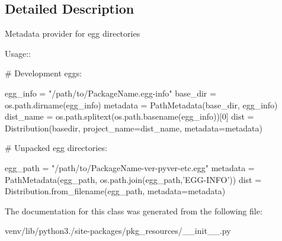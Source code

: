 \subsection{Detailed Description}
\begin{DoxyVerb}Metadata provider for egg directories

Usage::

    # Development eggs:

    egg_info = "/path/to/PackageName.egg-info"
    base_dir = os.path.dirname(egg_info)
    metadata = PathMetadata(base_dir, egg_info)
    dist_name = os.path.splitext(os.path.basename(egg_info))[0]
    dist = Distribution(basedir, project_name=dist_name, metadata=metadata)

    # Unpacked egg directories:

    egg_path = "/path/to/PackageName-ver-pyver-etc.egg"
    metadata = PathMetadata(egg_path, os.path.join(egg_path,'EGG-INFO'))
    dist = Distribution.from_filename(egg_path, metadata=metadata)
\end{DoxyVerb}
 

The documentation for this class was generated from the following file\+:\begin{DoxyCompactItemize}
\item 
venv/lib/python3./site-\/packages/pkg\+\_\+resources/\+\_\+\+\_\+init\+\_\+\+\_\+.\+py\end{DoxyCompactItemize}
